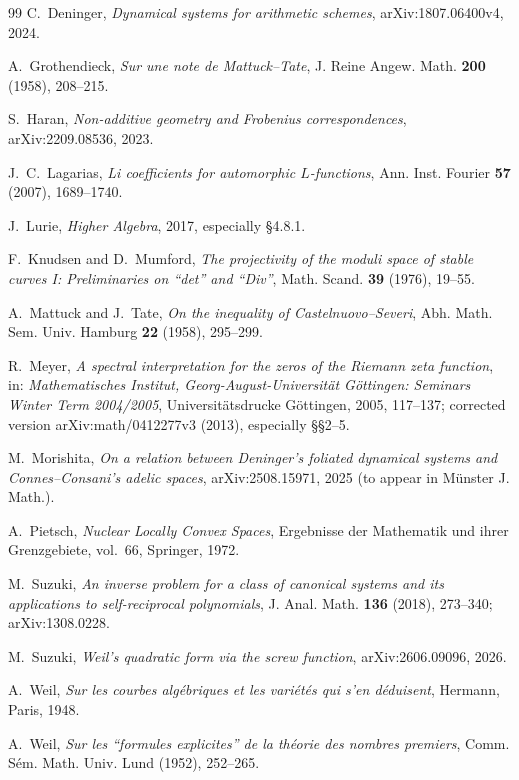 \documentclass[11pt]{amsart}
\theoremstyle{definition}
\theoremstyle{remark}
\begin{document}
\begin{thebibliography}{99}
C.~Deninger, \emph{Dynamical systems for arithmetic schemes},
arXiv:1807.06400v4, 2024.

A.~Grothendieck, \emph{Sur une note de Mattuck--Tate},
J. Reine Angew. Math. \textbf{200} (1958), 208--215.

S.~Haran, \emph{Non-additive geometry and Frobenius correspondences},
arXiv:2209.08536, 2023.

J.~C.~Lagarias, \emph{Li coefficients for automorphic $L$-functions},
Ann. Inst. Fourier \textbf{57} (2007), 1689--1740.

J.~Lurie, \emph{Higher Algebra}, 2017, especially \S4.8.1.

F.~Knudsen and D.~Mumford, \emph{The projectivity of the moduli space of
stable curves I: Preliminaries on ``det'' and ``Div''}, Math. Scand.
\textbf{39} (1976), 19--55.

A.~Mattuck and J.~Tate, \emph{On the inequality of Castelnuovo--Severi},
Abh. Math. Sem. Univ. Hamburg \textbf{22} (1958), 295--299.

R.~Meyer, \emph{A spectral interpretation for the zeros of the Riemann zeta
function}, in: \emph{Mathematisches Institut, Georg-August-Universit\"at
G\"ottingen: Seminars Winter Term 2004/2005}, Universit\"atsdrucke
G\"ottingen, 2005, 117--137; corrected version arXiv:math/0412277v3 (2013),
especially \S\S2--5.

M.~Morishita, \emph{On a relation between Deninger's foliated dynamical
systems and Connes--Consani's adelic spaces}, arXiv:2508.15971, 2025 (to appear in
M\"unster J. Math.).

A.~Pietsch, \emph{Nuclear Locally Convex Spaces}, Ergebnisse der Mathematik
und ihrer Grenzgebiete, vol.~66, Springer, 1972.

M.~Suzuki, \emph{An inverse problem for a class of canonical systems and its
applications to self-reciprocal polynomials}, J. Anal. Math. \textbf{136}
(2018), 273--340; arXiv:1308.0228.

M.~Suzuki, \emph{Weil's quadratic form via the screw function},
arXiv:2606.09096, 2026.

A.~Weil, \emph{Sur les courbes alg\'ebriques et les vari\'et\'es qui s'en
d\'eduisent}, Hermann, Paris, 1948.

A.~Weil, \emph{Sur les ``formules explicites'' de la th\'eorie des nombres
premiers}, Comm. S\'em. Math. Univ. Lund (1952), 252--265.


\end{thebibliography}
\end{document}
